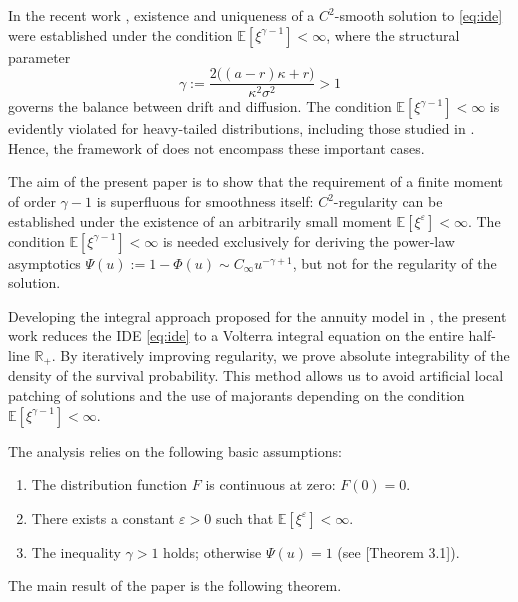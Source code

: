 \documentclass[smallextended]{svjour3}
\newcommand{\bbr}{\mathbb{R}}
\newcommand{\bbe}{\mathbb{E}}
\newcommand{\eps}{\varepsilon}
\begin{document}
In the recent work \cite{AK2026}, existence and uniqueness of a $C^2$-smooth solution to \eqref{eq:ide} were established under the condition $\mathbb{E}[\xi^{\gamma-1}]<\infty$, where the structural parameter
\begin{equation*}%
\gamma := \frac{2\big((a-r)\kappa + r\big)}{\kappa^2 \sigma^2} > 1
\end{equation*}
governs the balance between drift and diffusion. The condition $\mathbb{E}[\xi^{\gamma-1}]<\infty$ is evidently violated for heavy-tailed distributions, including those studied in \cite{Grandits2004}. Hence, the framework of \cite{AK2026} does not encompass these important cases.

The aim of the present paper is to show that the requirement of a finite moment of order $\gamma-1$ is superfluous for smoothness itself: $C^2$-regularity can be established under the existence of an arbitrarily small moment $\mathbb{E}[\xi^\varepsilon]<\infty$. The condition $\mathbb{E}[\xi^{\gamma-1}]<\infty$ is needed exclusively for deriving the power-law asymptotics $\Psi(u) := 1 - \Phi(u) \sim C_\infty u^{-\gamma+1}$, but not for the regularity of the solution.

Developing the integral approach proposed for the annuity model in \cite{Promyslov2026}, the present work reduces the IDE \eqref{eq:ide} to a Volterra integral equation on the entire half-line $\bbr_+$. By iteratively improving regularity, we prove absolute integrability of the density of the survival probability. This method allows us to avoid artificial local patching of solutions and the use of majorants depending on the condition $\bbe[\xi^{\gamma-1}] < \infty$.

The analysis relies on the following basic assumptions:
\begin{enumerate}[label=(\textbf{A\arabic*})]
    \item \label{assump:1} The distribution function $F$ is continuous at zero: $F(0)=0$.
    \item \label{assump:2} There exists a constant $\eps > 0$ such that $\bbe[\xi^\eps] < \infty$.
    \item \label{assump:3} The inequality $\gamma > 1$ holds; otherwise $\Psi(u) = 1$ (see \cite{Paulsen1993}[Theorem 3.1]).
\end{enumerate}

The main result of the paper is the following theorem.
\end{document}

